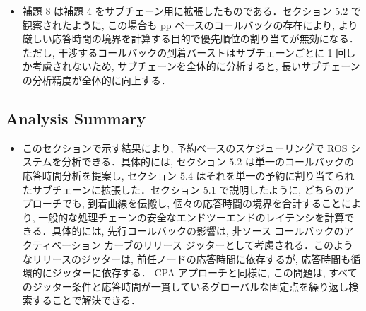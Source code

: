 \begin{frame}{}
    \begin{itemize}
        \item 補題 8 は補題 4 をサブチェーン用に拡張したものである．セクション 5.2 で観察されたように, この場合も pp ベースのコールバックの存在により, より厳しい応答時間の境界を計算する目的で優先順位の割り当てが無効になる．ただし, 干渉するコールバックの到着バーストはサブチェーンごとに 1 回しか考慮されないため, サブチェーンを全体的に分析すると, 長いサブチェーンの分析精度が全体的に向上する．
    \end{itemize}
\end{frame}


\subsection{Analysis Summary}
\label{ssec: analysis summary}

\begin{frame}{}
    \begin{itemize}
        \item このセクションで示す結果により, 予約ベースのスケジューリングで ROS システムを分析できる．具体的には, セクション $5.2$ は単一のコールバックの応答時間分析を提案し, セクション $5.4$ はそれを単一の予約に割り当てられたサブチェーンに拡張した．セクション 5.1 で説明したように, どちらのアプローチでも, 到着曲線を伝搬し, 個々の応答時間の境界を合計することにより, 一般的な処理チェーンの安全なエンドツーエンドのレイテンシを計算できる．具体的には, 先行コールバックの影響は, 非ソース コールバックのアクティベーション カーブのリリース ジッターとして考慮される．このようなリリースのジッターは, 前任ノードの応答時間に依存するが, 応答時間も循環的にジッターに依存する． CPA アプローチと同様に, この問題は, すべてのジッター条件と応答時間が一貫しているグローバルな固定点を繰り返し検索することで解決できる．
    \end{itemize}
\end{frame}
